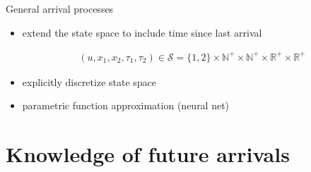 \documentclass[bigger]{beamer}
\begin{document}
\begin{frame}[label={sec:org45b68b2}]{General arrival processes}
\begin{itemize}
\item extend the state space to include time since last arrival

\begin{align}
(u, x_1, x_2, \tau_1, \tau_2) \in \mathcal{S} = \{1,2\} \times \mathbb{N}^+ \times \mathbb{N}^+ \times \mathbb{R}^+ \times \mathbb{R}^+
\end{align}

\item explicitly discretize state space
\item parametric function approximation (neural net)
\end{itemize}
\end{frame}
\section{Knowledge of future arrivals}
\label{sec:orgda73aa2}
\end{document}

